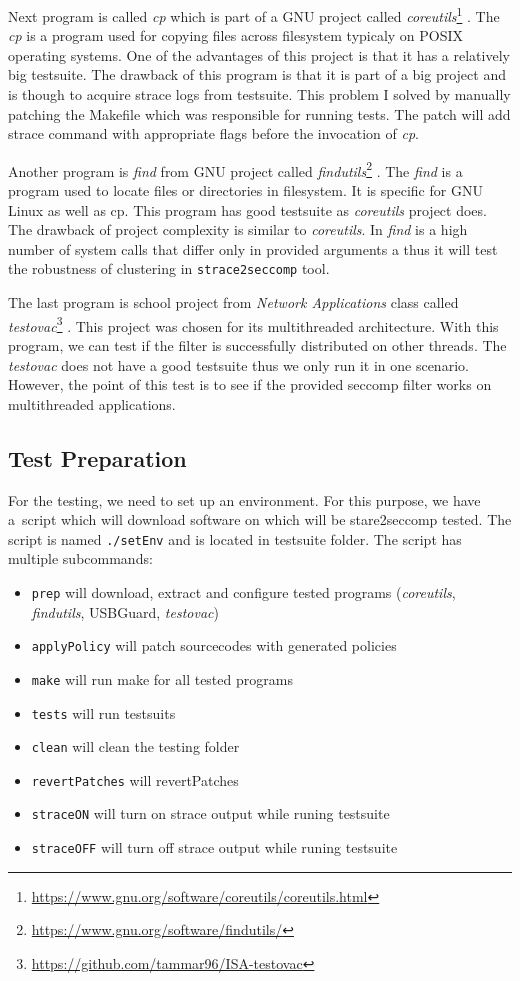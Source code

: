 Next program is called \emph{cp} which is part of a GNU project called
\emph{coreutils}\footnote{\url{https://www.gnu.org/software/coreutils/coreutils.html}} .
The \emph{cp} is a program used for copying files across filesystem typicaly on
POSIX operating systems. One of the advantages of this project is that it has a
relatively big testsuite. The drawback of this program is that it is part of a
big project and is though to acquire strace logs from testsuite. This problem I
solved by manually patching the Makefile which was responsible for running
tests. The patch will add strace command with appropriate flags before the
invocation of \emph{cp}.

Another program is \emph{find} from GNU project called
\emph{findutils}\footnote{\url{https://www.gnu.org/software/findutils/}} . The
\emph{find} is a program used to locate files or directories in filesystem. It
is specific for GNU Linux as well as cp. This program has good testsuite as
\emph{coreutils} project does. The drawback of project complexity is similar to
\emph{coreutils}. In \emph{find} is a high number of system calls that differ
only in provided arguments a thus it will test the robustness of clustering in
\texttt{strace2seccomp} tool.

The last program is school project from \emph{Network Applications} class called
\emph{testovac}\footnote{\url{https://github.com/tammar96/ISA-testovac}} . This
project was chosen for its multithreaded architecture. With this program, we can
test if the filter is successfully distributed on other threads. The
\emph{testovac} does not have a good testsuite thus we only run it in one
scenario. However, the point of this test is to see if the provided seccomp
filter works on multithreaded applications.

\subsection{Test Preparation}
For the testing, we need to set up an environment. For this purpose, we have
a~script which will download software on which will be stare2seccomp tested. The
script is named \texttt{./setEnv} and is located in testsuite folder.
The script has multiple subcommands:
\begin{itemize}
	\item \texttt{prep} will download, extract and configure tested programs
		(\emph{coreutils}, \emph{findutils}, USBGuard, \emph{testovac})
	\item \texttt{applyPolicy} will patch sourcecodes with generated policies
	\item \texttt{make} will run make for all tested programs
	\item \texttt{tests} will run testsuits
	\item \texttt{clean} will clean the testing folder
	\item \texttt{revertPatches} will revertPatches
	\item \texttt{straceON} will turn on strace output while runing testsuite
	\item \texttt{straceOFF} will turn off strace output while runing testsuite
\end{itemize}

